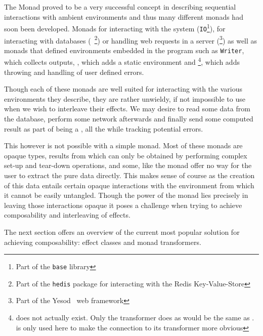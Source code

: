 The Monad proved to be a very successful concept in describing
sequential interactions with ambient environments and thus many
different monads had soon been developed. Monads for interacting with
the system (\texttt{IO}\footnote{Part of the \texttt{base} library}),
for interacting with databases (\RedisM{}~\footnote{Part of the
  \texttt{hedis}\cite{hedis} package for interacting with the Redis
  Key-Value-Store}) or handling web requests in a server
(\HandlerForM{}\footnote{Part of the Yesod~\cite{yesod} web
  framework}) as well as monads that defined environments embedded in
the program such as \texttt{Writer}, which collects outputs,
\ReaderM{}, which adds a static environment and
\ExceptM{}\footnote{\ExceptM{} does not actually exist. Only the
  transformer \ExceptT{} does as \ExceptM{} would be the same as
  \EitherM{}. \ExceptM{} is only used here to make the connection to
  its transformer more obvious}, which adds throwing and handling of
user defined errors.

Though each of these monads are well suited for interacting with the
various environments they describe, they are rather unwieldy, if not
impossible to use when we wish to interleave their effects. We may
desire to read some data from the \RedisM{} database, perform some
network \IOM{} afterwards and finally send some computed result as
part of being a \HandlerForM{}, all the while tracking potential
\ExceptM{} errors.

This however is not possible with a simple monad. Most of these monads
are opaque types, results from which can only be obtained by
performing complex set-up and tear-down operations, and some, like the
\HandlerForM{} monad offer no way for the user to extract the pure
data directly. This makes sense of course as the creation of this data
entails certain opaque interactions with the environment from which it
cannot be easily untangled. Though the power of the monad lies
precisely in leaving those interactions opaque it poses a challenge
when trying to achieve composability and interleaving of effects.

The next section offers an overview of the current most popular
solution for achieving composability: effect classes and monad
transformers.
